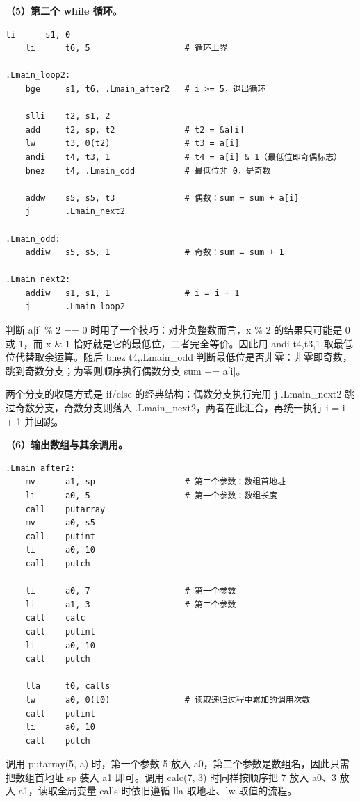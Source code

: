 \documentclass[UTF8,a4paper,10pt]{ctexart}
\begin{document}
\textbf{（5）第二个 while 循环。}

\begin{lstlisting}[language=riscv]
    li      s1, 0
    li      t6, 5                   # 循环上界

.Lmain_loop2:
    bge     s1, t6, .Lmain_after2   # i >= 5，退出循环

    slli    t2, s1, 2
    add     t2, sp, t2              # t2 = &a[i]
    lw      t3, 0(t2)               # t3 = a[i]
    andi    t4, t3, 1               # t4 = a[i] & 1（最低位即奇偶标志）
    bnez    t4, .Lmain_odd          # 最低位非 0，是奇数

    addw    s5, s5, t3              # 偶数：sum = sum + a[i]
    j       .Lmain_next2

.Lmain_odd:
    addiw   s5, s5, 1               # 奇数：sum = sum + 1

.Lmain_next2:
    addiw   s1, s1, 1               # i = i + 1
    j       .Lmain_loop2
\end{lstlisting}

判断 a[i] \% 2 == 0 时用了一个技巧：对非负整数而言，x \% 2 的结果只可能是 0 或 1，而 x \& 1 恰好就是它的最低位，二者完全等价。因此用 andi t4,t3,1 取最低位代替取余运算。随后 bnez t4,.Lmain\_odd 判断最低位是否非零：非零即奇数，跳到奇数分支；为零则顺序执行偶数分支 sum += a[i]。

两个分支的收尾方式是 if/else 的经典结构：偶数分支执行完用 j .Lmain\_next2 跳过奇数分支，奇数分支则落入 .Lmain\_next2，两者在此汇合，再统一执行 i = i + 1 并回跳。

\textbf{（6）输出数组与其余调用。}

\begin{lstlisting}[language=riscv]
.Lmain_after2:
    mv      a1, sp                  # 第二个参数：数组首地址
    li      a0, 5                   # 第一个参数：数组长度
    call    putarray
    mv      a0, s5
    call    putint
    li      a0, 10
    call    putch

    li      a0, 7                   # 第一个参数
    li      a1, 3                   # 第二个参数
    call    calc
    call    putint
    li      a0, 10
    call    putch

    lla     t0, calls
    lw      a0, 0(t0)               # 读取递归过程中累加的调用次数
    call    putint
    li      a0, 10
    call    putch
\end{lstlisting}

调用 putarray(5, a) 时，第一个参数 5 放入 a0，第二个参数是数组名，因此只需把数组首地址 sp 装入 a1 即可。调用 calc(7, 3) 时同样按顺序把 7 放入 a0、3 放入 a1，读取全局变量 calls 时依旧遵循 lla 取地址、lw 取值的流程。
\end{document}
